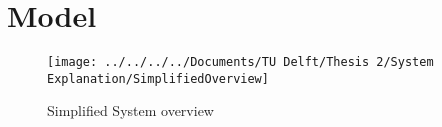 \chapter{Model}

\begin{figure}[h]
	\centering
	\texttt{[image: ../../../../Documents/TU Delft/Thesis 2/System Explanation/SimplifiedOverview]}
	\caption{Simplified System overview}
\end{figure}
